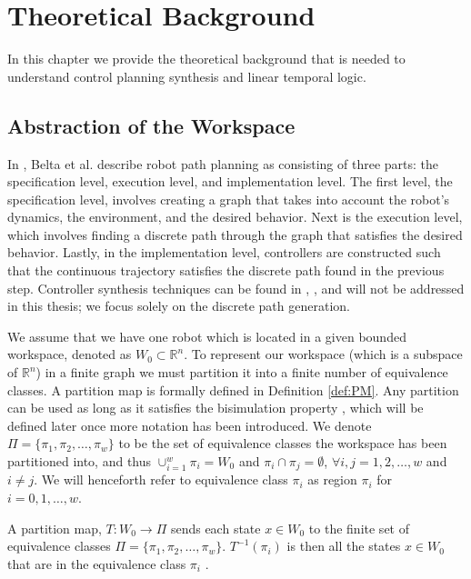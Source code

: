 \chapter{Theoretical Background}
In this chapter we provide the theoretical background that is needed to understand control planning synthesis and linear temporal logic. 

\section{Abstraction of the Workspace}

In \cite{belta07}, Belta et al. describe robot path planning as consisting of three parts: the specification level, execution level, and implementation level. The first level, the specification level, involves creating a graph that takes into account the robot's dynamics, the environment, and the desired behavior. Next is the execution level, which involves finding a discrete path through the graph that satisfies the desired behavior. Lastly, in the implementation level, controllers are constructed such that the continuous trajectory satisfies the discrete path found in the previous step. Controller synthesis techniques can be found in \cite{conner2003}, \cite{belta2004}, \cite{habets2004} and will not be addressed in this thesis; we focus solely on the discrete path generation.

We assume that we have one robot which is located in a given bounded workspace, denoted as $W_0 \subset \mathbb{R}^n$. To represent our workspace (which is a subspace of $\mathbb{R}^n$) in a finite graph we must partition it into a finite number of equivalence classes. A partition map is formally defined in Definition \ref{def:PM}. Any partition can be used as long as it satisfies the bisimulation property \cite{belta04}, which will be defined later once more notation has been introduced. We denote $\Pi = \{\pi_1, \pi_2, \dots, \pi_w\}$ to be the set of equivalence classes the workspace has been partitioned into, and thus $\cup_{i=1}^w \pi_i = W_0$ and $\pi_i \cap \pi_j = \emptyset$, $\forall i,j=1,2,\dots,w$ and $i\neq j$. We will henceforth refer to equivalence class $\pi_i$ as region $\pi_i$ for $i = 0,1,\dots, w$. 

\begin{definition}
\label{def:PM}
A partition map, $T: W_0 \rightarrow \Pi$ sends each state $x \in W_0$ to the finite set of equivalence classes $\Pi = \{\pi_1, \pi_2, \dots, \pi_w\}$. $T^{-1}(\pi_i)$ is then all the states $x \in W_0$ that are in the equivalence class $\pi_i$ \cite{fainekos05}. 
\end{definition} 

